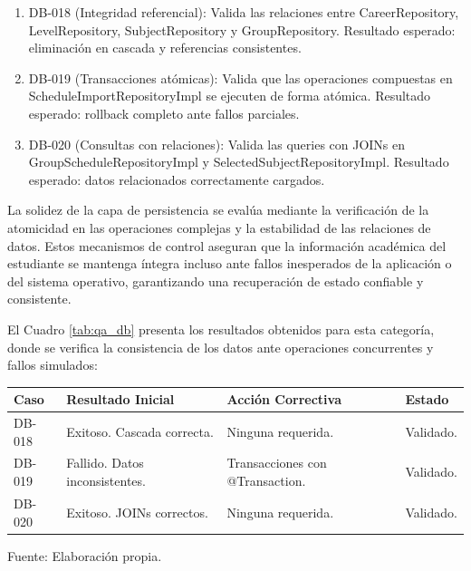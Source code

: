   \begin{enumerate}[label=\alph*)]
    \item DB-018 (Integridad referencial): Valida las relaciones entre CareerRepository, LevelRepository, SubjectRepository y GroupRepository. Resultado esperado: eliminación en cascada y referencias consistentes.
    
    \item DB-019 (Transacciones atómicas): Valida que las operaciones compuestas en ScheduleImportRepositoryImpl se ejecuten de forma atómica. Resultado esperado: rollback completo ante fallos parciales.
    
    \item DB-020 (Consultas con relaciones): Valida las queries con JOINs en GroupScheduleRepositoryImpl y SelectedSubjectRepositoryImpl. Resultado esperado: datos relacionados correctamente cargados.
  \end{enumerate}
  
  La solidez de la capa de persistencia se evalúa mediante la verificación de la atomicidad en las operaciones complejas y la estabilidad de las relaciones de datos. Estos mecanismos de control aseguran que la información académica del estudiante se mantenga íntegra incluso ante fallos inesperados de la aplicación o del sistema operativo, garantizando una recuperación de estado confiable y consistente.
  
  El Cuadro \ref{tab:qa_db} presenta los resultados obtenidos para esta categoría, donde se verifica la consistencia de los datos ante operaciones concurrentes y fallos simulados:
  
  \begin{center}
  \begin{minipage}{\linewidth}
  \centering
  \begin{tabularx}{\linewidth}{@{}>{\RaggedRight\arraybackslash}p{2.0cm}>{\RaggedRight\arraybackslash}X>{\RaggedRight\arraybackslash}X>{\RaggedRight\arraybackslash}p{1.8cm}@{}}
  \toprule
  Caso & Resultado Inicial & Acción Correctiva & Estado \\
  \midrule
  DB-018 & Exitoso. Cascada correcta. & Ninguna requerida. & Validado. \\
  \addlinespace
  DB-019 & Fallido. Datos inconsistentes. & Transacciones con @Transaction. & Validado. \\
  \addlinespace
  DB-020 & Exitoso. JOINs correctos. & Ninguna requerida. & Validado. \\
  \bottomrule
  \end{tabularx}
  \label{tab:qa_db}
  Fuente: Elaboración propia.
  \end{minipage}
  \end{center}
  
